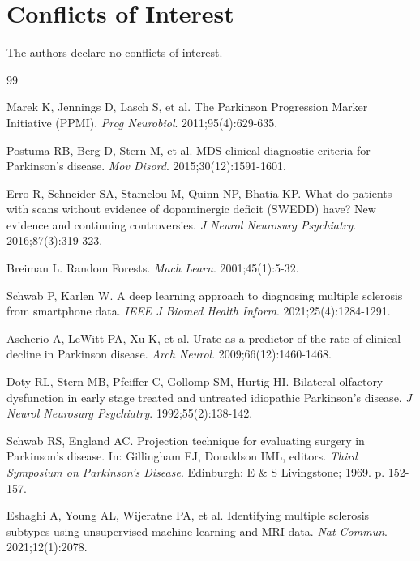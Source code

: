 \documentclass[12pt,a4paper]{article}
\begin{document}
\section*{Conflicts of Interest}
The authors declare no conflicts of interest.

\begin{thebibliography}{99}

Marek K, Jennings D, Lasch S, et al. The Parkinson Progression Marker Initiative (PPMI). \textit{Prog Neurobiol}. 2011;95(4):629-635.

Postuma RB, Berg D, Stern M, et al. MDS clinical diagnostic criteria for Parkinson's disease. \textit{Mov Disord}. 2015;30(12):1591-1601.

Erro R, Schneider SA, Stamelou M, Quinn NP, Bhatia KP. What do patients with scans without evidence of dopaminergic deficit (SWEDD) have? New evidence and continuing controversies. \textit{J Neurol Neurosurg Psychiatry}. 2016;87(3):319-323.

Breiman L. Random Forests. \textit{Mach Learn}. 2001;45(1):5-32.

Schwab P, Karlen W. A deep learning approach to diagnosing multiple sclerosis from smartphone data. \textit{IEEE J Biomed Health Inform}. 2021;25(4):1284-1291.

Ascherio A, LeWitt PA, Xu K, et al. Urate as a predictor of the rate of clinical decline in Parkinson disease. \textit{Arch Neurol}. 2009;66(12):1460-1468.

Doty RL, Stern MB, Pfeiffer C, Gollomp SM, Hurtig HI. Bilateral olfactory dysfunction in early stage treated and untreated idiopathic Parkinson's disease. \textit{J Neurol Neurosurg Psychiatry}. 1992;55(2):138-142.

Schwab RS, England AC. Projection technique for evaluating surgery in Parkinson's disease. In: Gillingham FJ, Donaldson IML, editors. \textit{Third Symposium on Parkinson's Disease}. Edinburgh: E \& S Livingstone; 1969. p. 152-157.

Eshaghi A, Young AL, Wijeratne PA, et al. Identifying multiple sclerosis subtypes using unsupervised machine learning and MRI data. \textit{Nat Commun}. 2021;12(1):2078.


\end{thebibliography}
\end{document}
